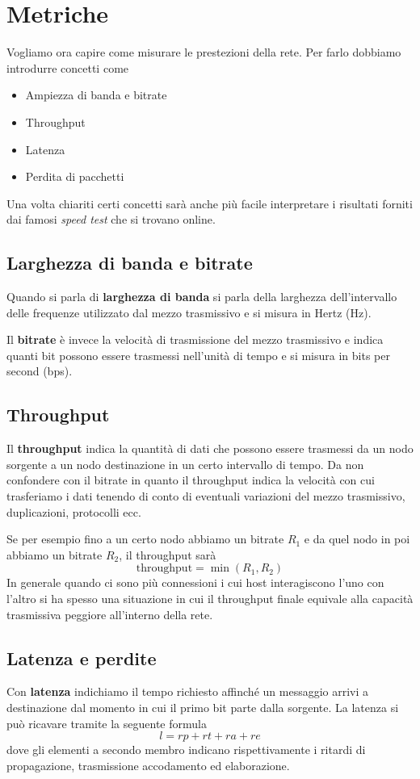 \section{Metriche}
Vogliamo ora capire come misurare le prestezioni della rete. Per farlo dobbiamo introdurre concetti
come
\begin{itemize}
	\item Ampiezza di banda e bitrate
	\item Throughput
	\item Latenza
	\item Perdita di pacchetti
\end{itemize}
Una volta chiariti certi concetti sarà anche più facile interpretare i risultati forniti dai famosi
\emph{speed test} che si trovano online.

\subsection{Larghezza di banda e bitrate}
Quando si parla di \textbf{larghezza di banda} si parla della larghezza dell'intervallo delle
frequenze utilizzato dal mezzo trasmissivo e si misura in Hertz (Hz).

Il \textbf{bitrate} è invece la velocità di trasmissione del mezzo trasmissivo e indica quanti bit
possono essere trasmessi nell'unità di tempo e si misura in bits per second (bps).

\subsection{Throughput}
Il \textbf{throughput} indica la quantità di dati che possono essere trasmessi da un nodo sorgente
a un nodo destinazione in un certo intervallo di tempo. Da non confondere con il bitrate in quanto
il throughput indica la velocità con cui trasferiamo i dati tenendo di conto di eventuali
variazioni del mezzo trasmissivo, duplicazioni, protocolli ecc.

Se per esempio fino a un certo nodo abbiamo un bitrate $R_1$ e da quel nodo in poi abbiamo un
bitrate $R_2$, il throughput sarà
\[ \text{throughput} = \min (R_1, R_2) \]
In generale quando ci sono più connessioni i cui host interagiscono l'uno con l'altro si ha spesso
una situazione in cui il throughput finale equivale alla capacità trasmissiva peggiore all'interno
della rete.

\subsection{Latenza e perdite}
Con \textbf{latenza} indichiamo il tempo richiesto affinché un messaggio arrivi a destinazione dal
momento in cui il primo bit parte dalla sorgente. La latenza si può ricavare tramite la seguente 
formula
\[ l = rp + rt + ra + re \]
dove gli elementi a secondo membro indicano rispettivamente i ritardi di propagazione, trasmissione
accodamento ed elaborazione.

